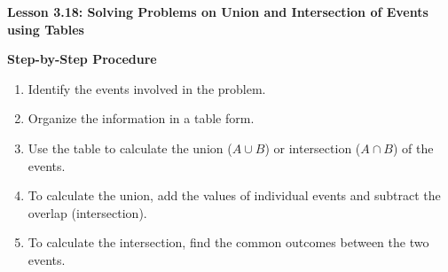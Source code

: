 \begin{center}
\textbf{Lesson 3.18: Solving Problems on Union and Intersection of Events using Tables}
\end{center}

\vspace*{-1.5ex}

\noindent\textbf{Step-by-Step Procedure}

\begin{enumerate}
    \item Identify the events involved in the problem.
    \item Organize the information in a table form.
    \item Use the table to calculate the union (\(A \cup B\)) or intersection (\(A \cap B\)) of the events.
    \item To calculate the union, add the values of individual events and subtract the overlap (intersection).
    \item To calculate the intersection, find the common outcomes between the two events.
\end{enumerate}
